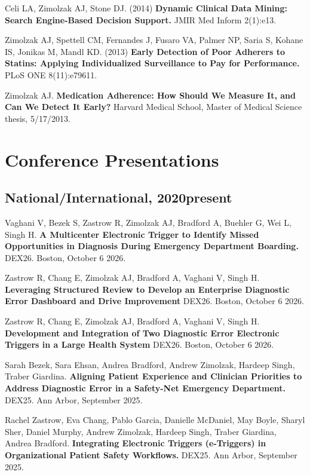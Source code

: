 \documentclass[10pt]{article}
\begin{document}
Celi LA, Zimolzak AJ, Stone DJ. (2014) \textbf{Dynamic Clinical Data
  Mining: Search Engine-Based Decision Support.} JMIR Med Inform
2(1):e13.

Zimolzak AJ, Spettell CM, Fernandes J, Fusaro VA, Palmer NP, Saria S,
Kohane IS, Jonikas M, Mandl KD. (2013) \textbf{Early Detection of Poor
  Adherers to Statins: Applying Individualized Surveillance to Pay for
  Performance.} PLoS ONE 8(11):e79611.

Zimolzak AJ. \textbf{Medication Adherence: How Should We Measure It,
  and Can We Detect It Early?} Harvard Medical School, Master of
Medical Science thesis, 5/17/2013.



\section{Conference Presentations}  %


\subsection{National/International, 2020\ndash{}present}

Vaghani V, Bezek S, Zastrow R, Zimolzak AJ, Bradford A, Buehler G, Wei L, Singh H. \textbf{A Multicenter Electronic Trigger to Identify Missed Opportunities in Diagnosis During Emergency Department Boarding.} DEX26. Boston, October 6 2026.  %

Zastrow R, Chang E, Zimolzak AJ, Bradford A, Vaghani V, Singh H. \textbf{Leveraging Structured Review to Develop an Enterprise Diagnostic Error Dashboard and Drive Improvement} DEX26. Boston, October 6 2026.  %

Zastrow R, Chang E, Zimolzak AJ, Bradford A, Vaghani V, Singh H. \textbf{Development and Integration of Two Diagnostic Error Electronic Triggers in a Large Health System} DEX26. Boston, October 6 2026.  %


Sarah Bezek, Sara Ehsan, Andrea Bradford, Andrew Zimolzak, Hardeep
Singh, Traber Giardina. \textbf{Aligning Patient Experience and
  Clinician Priorities to Address Diagnostic Error in a Safety-Net
  Emergency Department.} DEX25. Ann Arbor, September 2025.

Rachel Zastrow, Eva Chang, Pablo Garcia, Danielle McDaniel, May Boyle,
Sharyl Sher, Daniel Murphy, Andrew Zimolzak, Hardeep Singh, Traber
Giardina, Andrea Bradford. \textbf{Integrating Electronic Triggers
  (e-Triggers) in Organizational Patient Safety Workflows.} DEX25. Ann
Arbor, September 2025.
\end{document}

